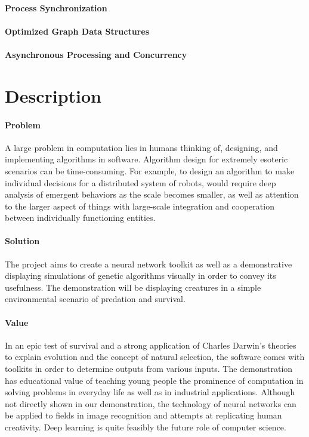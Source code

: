 \documentclass[letterpaper, 10pt]{article}
\begin{document}
	\paragraph{Process Synchronization}
	
	\paragraph{Optimized Graph Data Structures}
	
	\paragraph{Asynchronous Processing and Concurrency}
	
\cleardoublepage
\section{Description}
	\paragraph{Problem} A large problem in computation lies in humans thinking of, designing, and implementing algorithms in software. Algorithm design for extremely esoteric scenarios can be time-consuming. For example, to design an algorithm to make individual decisions for a distributed system of robots, would require deep analysis of emergent behaviors as the scale becomes smaller, as well as attention to the larger aspect of things with large-scale integration and cooperation between individually functioning entities.
	\paragraph{Solution} The project aims to create a neural network toolkit as well as a demonstrative displaying simulations of genetic algorithms visually in order to convey its usefulness. The demonstration will be displaying creatures in a simple environmental scenario of predation and survival.
	\paragraph{Value} In an epic test of survival and a strong application of Charles Darwin's theories to explain evolution and the concept of natural selection, the software comes with toolkits in order to determine outputs from various inputs. The demonstration has educational value of teaching young people the prominence of computation in solving problems in everyday life as well as in industrial applications. Although not directly shown in our demonstration, the technology of neural networks can be applied to fields in image recognition and attempts at replicating human creativity. Deep learning is quite feasibly the future role of computer science.
\cleardoublepage
\end{document}
